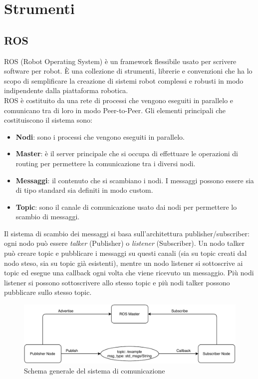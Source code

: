 \chapter{Strumenti}

\section{ROS}

ROS (Robot Operating System) è un framework flessibile usato per scrivere software per robot.
È una collezione di strumenti, librerie e convenzioni che ha lo scopo di semplificare la creazione di sistemi robot complessi e robusti in modo indipendente dalla piattaforma robotica. \\
ROS è costituito da una rete di processi che vengono eseguiti in parallelo e comunicano tra di loro in modo Peer-to-Peer.
Gli elementi principali che costituiscono il sistema sono:
\begin{itemize}
  \item \textbf{Nodi}: sono i processi che vengono eseguiti in parallelo.
  \item \textbf{Master}: è il server principale che si occupa di effettuare le operazioni di routing per permettere la comunicazione tra i diversi nodi.
  \item \textbf{Messaggi}: il contenuto che si scambiano i nodi. I messaggi possono essere sia di tipo standard sia definiti in modo custom.
  \item \textbf{Topic}: sono il canale di comunicazione usato dai nodi per permettere lo scambio di messaggi.
\end{itemize}
Il sistema di scambio dei messaggi si basa sull'architettura publisher/subscriber: ogni nodo può essere \textit{talker} (Publisher) o \textit{listener}  (Subscriber).
Un nodo talker può creare topic e pubblicare i messaggi su questi canali (sia su topic creati dal nodo steso, sia su topic già esistenti), mentre un nodo listener si sottoscrive ai topic ed esegue una callback ogni volta che viene ricevuto un messaggio. Più nodi listener si possono sottoscrivere allo stesso topic e più nodi talker possono pubblicare sullo stesso topic.

\begin{figure}[H]
\centering
\includegraphics[scale=0.9]{images/ros_system.pdf}
\caption{Schema generale del sistema di comunicazione}
\end{figure}

